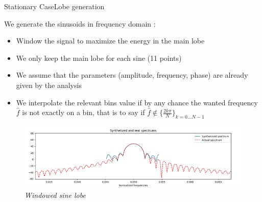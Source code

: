\documentclass{bredelebeamer}
\begin{document}
\begin{frame}{Stationary Case}{Lobe generation}
\begin{block}{}
We generate the sinusoids in frequency domain : \\

\begin{itemize}
\item Window the signal to maximize the energy in the main lobe
\item We only keep the main lobe for each sine (11 points)
\item We assume that the parameters (amplitude, frequency, phase) are already given by the analysis
\item We interpolate the relevant bins value if by any chance the wanted frequency $\hat{f}$ is not exactly on a bin, that is to say if $\hat{f} \notin \{\frac{2 k \pi}{N} \}_{k=0...N-1}$
\end{itemize}
\end{block}
\begin{figure}
	\centerline
	{\includegraphics[scale=0.45]{lobe.png}}
	\caption{\it Windowed sine lobe}
\end{figure}
\end{frame}
\end{document}

